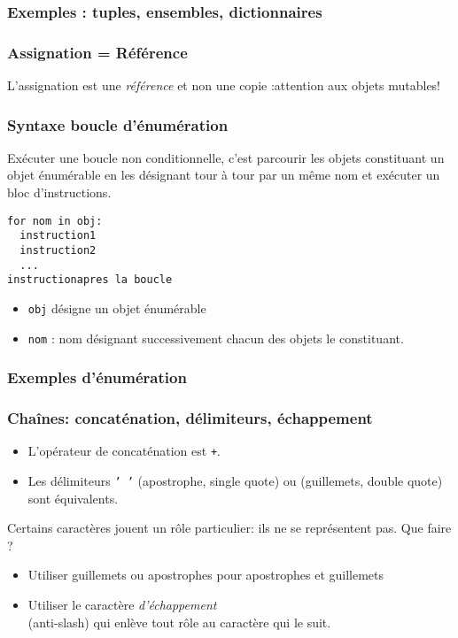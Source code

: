 \begin{frame}
  \frametitle{Exemples : tuples, ensembles, dictionnaires}
    
\end{frame}

\begin{frame}
  \frametitle{Assignation = Référence}
L'assignation est une \emph{référence} et non une copie :\newline attention aux objets  mutables! 

\end{frame}

\begin{frame}[fragile]
  \frametitle{Syntaxe boucle d'énumération}
Exécuter une boucle non conditionnelle, c'est parcourir les objets constituant un objet énumérable en les désignant tour à tour par un même nom et exécuter un bloc d'instructions. 
\begin{verbatim}
for nom in obj:
  instruction1
  instruction2
  ...
instructionapres la boucle\end{verbatim}
\begin{itemize}
  \item \texttt{obj} désigne un objet énumérable
  \item \texttt{nom} : nom désignant successivement chacun des objets le constituant. 
\end{itemize}
\end{frame}

\begin{frame}
  \frametitle{Exemples d'énumération}

\end{frame}

\begin{frame}
  \frametitle{Chaînes: concaténation, délimiteurs, échappement}
\begin{itemize}
  \item L'opérateur de concaténation est \texttt{+}.
  \item Les délimiteurs \texttt{' '} (apostrophe, single quote) ou  (guillemets, double quote) sont équivalents.
\end{itemize}
Certains caractères jouent un rôle particulier: \og ils ne se représentent pas\fg. Que faire ?
\begin{itemize}
  \item Utiliser guillemets ou apostrophes pour apostrophes et guillemets
  \item Utiliser le caractère \emph{d'échappement} \\ (anti-slash) qui enlève tout rôle au caractère qui le suit.
\end{itemize}
\end{frame}

